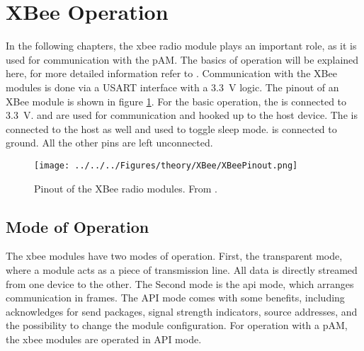 \section{XBee Operation}
\label{sec:theory:XBee}
In the following chapters, the \acs{xbee} radio module plays an important role, as it is used for communication with the \ac{pAM}. The basics of operation will be explained here, for more detailed information refer to \cite{xbeemanual}.
Communication with the XBee modules is done via a \ac{USART} interface with a \SI{3.3}{\volt} logic.
The pinout of an XBee module is shown in figure \ref{fig:theory:XBeePinout}. For the basic operation, the  is connected to \SI{3.3}{\volt}.  and  are used for communication and hooked up to the host device. The  is connected to the host as well and used to toggle sleep mode.  is connected to ground. All the other pins are left unconnected.
\begin{figure}
	\centering
	\texttt{[image: ../../../Figures/theory/XBee/XBeePinout.png]}
	\caption{Pinout of the XBee radio modules. From \cite{XBeePinout}.}
	\label{fig:theory:XBeePinout}
\end{figure}
\subsection{Mode of Operation}
The \acs{xbee} modules have two modes of operation. First, the transparent mode, where a module acts as a piece of transmission line. All data is directly streamed from one device to the other. The Second mode is the \ac{api} mode, which arranges communication in frames. The API mode comes with some benefits, including acknowledges for send packages, signal strength indicators, source addresses, and the possibility to change the module configuration. For operation with a \ac{pAM}, the \acs{xbee} modules are operated in API mode.
